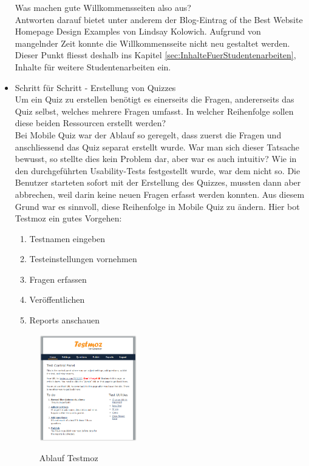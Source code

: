 \begin{itemize}
		Was machen gute Willkommensseiten also aus? \\
		Antworten darauf bietet unter anderem der Blog-Eintrag  of the Best Website Homepage Design Examples\grqq \cite{hubspot_kolowich} von Lindsay Kolowich.
		Aufgrund von mangelnder Zeit konnte die Willkommensseite nicht neu gestaltet werden. Dieser Punkt fliesst deshalb ins Kapitel \ref{sec:InhalteFuerStudentenarbeiten}, Inhalte für weitere Studentenarbeiten ein.
		
		
		\item Schritt für Schritt - Erstellung von Quizzes \\
		Um ein Quiz zu erstellen benötigt es einerseits die Fragen, andererseits das Quiz selbst, welches mehrere Fragen umfasst. In welcher Reihenfolge sollen diese beiden Ressourcen erstellt werden? \\
		Bei Mobile Quiz war der Ablauf so geregelt, dass zuerst die Fragen und anschliessend das Quiz separat erstellt wurde. War man sich dieser Tatsache bewusst, so stellte dies kein Problem dar, aber war es auch intuitiv? Wie in den durchgeführten Usability-Tests \hyperlink{page.\getpagerefnumber{pdf:UTAW1}}{} festgestellt wurde, war dem nicht so. Die Benutzer starteten sofort mit der Erstellung des Quizzes, mussten dann aber abbrechen, weil darin keine neuen Fragen erfasst werden konnten.
		Aus diesem Grund war es sinnvoll, diese Reihenfolge in Mobile Quiz zu ändern. Hier bot Testmoz \cite{testmoz.com} ein gutes Vorgehen:
		
		\begin{enumerate}
			\item Testnamen eingeben
			\item Testeinstellungen vornehmen
			\item Fragen erfassen
			\item Veröffentlichen
			\item Reports anschauen
		\end{enumerate}
		
		\begin{figure}[H]
			\centering
			\includegraphics[width=0.4\textwidth]{Images/Testmoz2.PNG}
			\caption{Ablauf Testmoz}
			\cite{testmoz.com}
		\end{figure}
		

\end{itemize}
